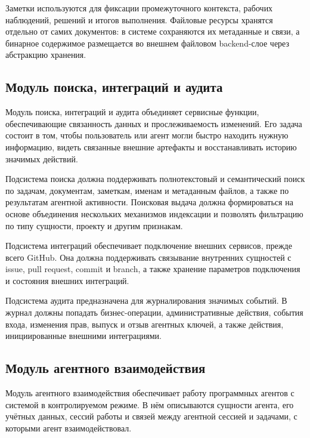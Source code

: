 Заметки используются для фиксации промежуточного контекста, рабочих наблюдений, решений и итогов выполнения. Файловые ресурсы хранятся отдельно от самих документов: в системе сохраняются их метаданные и связи, а бинарное содержимое размещается во внешнем файловом backend-слое через абстракцию хранения.

\textheadingsep
\subsection{Модуль поиска, интеграций и аудита}

\headingtextsep

Модуль поиска, интеграций и аудита объединяет сервисные функции, обеспечивающие связанность данных и прослеживаемость изменений. Его задача состоит в том, чтобы пользователь или агент могли быстро находить нужную информацию, видеть связанные внешние артефакты и восстанавливать историю значимых действий.

Подсистема поиска должна поддерживать полнотекстовый и семантический поиск по задачам, документам, заметкам, именам и метаданным файлов, а также по результатам агентной активности. Поисковая выдача должна формироваться на основе объединения нескольких механизмов индексации и позволять фильтрацию по типу сущности, проекту и другим признакам.

Подсистема интеграций обеспечивает подключение внешних сервисов, прежде всего GitHub. Она должна поддерживать связывание внутренних сущностей с issue, pull request, commit и branch, а также хранение параметров подключения и состояния внешних интеграций.

Подсистема аудита предназначена для журналирования значимых событий. В журнал должны попадать бизнес-операции, административные действия, события входа, изменения прав, выпуск и отзыв агентных ключей, а также действия, инициированные внешними интеграциями.

\textheadingsep
\subsection{Модуль агентного взаимодействия}

\headingtextsep

Модуль агентного взаимодействия обеспечивает работу программных агентов с системой в контролируемом режиме. В нём описываются сущности агента, его учётных данных, сессий работы и связей между агентной сессией и задачами, с которыми агент взаимодействовал.

